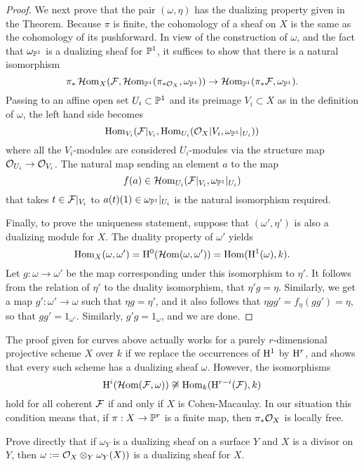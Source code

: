 \begin{proof}
We next prove that the pair $(\omega, \eta)$ has the dualizing property given in the 
Theorem.  Because $\pi$ is finite, the cohomology of a sheaf on $X$ is the same as the cohomology of its pushforward. In view of the construction of $\omega$, and the fact that $\omega_{{\mathbb P}^{1}}$ is a dualizing sheaf for ${\mathbb P}^{1}$, it suffices to show that there is a natural isomorphism
$$
\pi_{*}\operatorname{{\mathcal H} om}_{X}({\mathcal F},\operatorname{{\mathcal H} om}_{{\mathbb P}^{1}}(\pi_{*{\mathcal O}_{X}}, \omega_{{\mathbb P}^{1}})) \to \operatorname{{\mathcal H} om}_{{\mathbb P}^{1}}(\pi_{*}{\mathcal F}, \omega_{{\mathbb P}^{1}}).
$$
Passing to an affine open set $U_{i}\subset {\mathbb P}^{1}$ and its preimage $V_{i}\subset X$
as in the definition of $\omega$,  the left hand side becomes
$$
\operatorname{Hom}_{V_{i}}({\mathcal F}|_{V_{i}}, \operatorname{Hom}_{U_{i}}({\mathcal O}_{X}|V_{i}, \omega_{{\mathbb P}^{1}}|_{U_{i}}))
$$
where all the $V_{i}$-modules are considered $U_{i}$-modules via the structure
map ${\mathcal O}_{U_{i}} \to {\mathcal O}_{V_{i}}$. The natural map sending an element $a$ to
the map 
$$
f(a) \in \operatorname{{\mathcal H} om}_{U_{i}}({\mathcal F}|_{V_{i}}, \omega_{{\mathbb P}^{1}}|_{U_{i}})
$$
that takes $t\in {\mathcal F}|_{V_{i}}$ to $a(t)(1)\in \omega_{{\mathbb P}^{1}}|_{U_{i}}$ is the natural
isomorphism required.

Finally, to prove the uniqueness statement, suppose that $(\omega',\eta')$ is also a dualizing module for $X$. The duality property of $\omega'$ yields
$$
\operatorname{Hom}_{X}(\omega, \omega') = {\rm{H}}^{0}(\operatorname{{\mathcal H} om}(\omega, \omega')) = \operatorname{Hom}({\rm{H}}^{1}(\omega), k).
$$
Let $g: \omega \to \omega'$ be the map corresponding under this isomorphism to $\eta'$. It follows from the relation of $\eta'$ to the duality isomorphism, that 
$\eta'g = \eta$. Similarly, we get a map $g':\omega'\to \omega$ such that
$\eta g = \eta'$, and it also follows that $\eta gg' = f_{\eta}(gg') =  \eta$, so that
$gg' = 1_{\omega'}$. Similarly, $g'g = 1_{\omega}$, and we are done.
\end{proof}

\begin{fact} The proof given for curves above actually works for a purely $r$-dimensional projective scheme $X$ over $k$ if we replace the occurrences of  ${\rm{H}}^{1}$ by ${\rm{H}}^{r}$, and shows that every such scheme has a dualizing sheaf $\omega$. However, the isomorphisms
$$
{\rm{H}}^{i} (\operatorname{{\mathcal H} om}({\mathcal F}, \omega)) \not\cong \operatorname{Hom}_{k}({\rm{H}}^{r-i}({\mathcal F}), k) 
$$
hold for all coherent ${\mathcal F}$ if and only if $X$ is Cohen-Macaulay. In our situation
this condition means that, if $\pi: X\to {\mathbb P}^{r}$ is a finite map, then $\pi_{*}{\mathcal O}_{X}$
is locally free.

 
\end{fact}
\begin{exercise} Prove directly that if $\omega_{Y}$ is a dualizing sheaf on a surface $Y$ and $X$ is a divisor on $Y$, then
$\omega := {\mathcal O}_{X}\otimes_{Y}\omega_{Y}(X))$ is a dualizing sheaf for $X$.  
\end{exercise}

